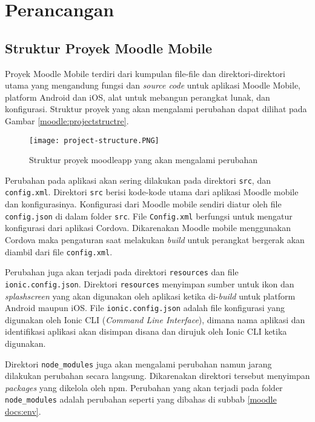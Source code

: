 \chapter{Perancangan}
\label{perancangan} 

\section{Struktur Proyek Moodle Mobile}
\label{struktur proyek}

Proyek Moodle Mobile terdiri dari kumpulan file-file dan direktori-direktori utama yang mengandung fungsi dan \textit{source code} untuk aplikasi Moodle Mobile, platform Android dan iOS, alat untuk mebangun perangkat lunak, dan konfigurasi. Struktur proyek yang akan mengalami perubahan dapat dilihat pada Gambar \ref{moodle:projectstructre}.
\\
\begin{figure}[H]
\centering
\texttt{[image: project-structure.PNG]}
\caption{Struktur proyek moodleapp yang akan mengalami perubahan}
\label{moodel:projectstructure}
\end{figure}

Perubahan pada aplikasi akan sering dilakukan pada direktori \texttt{src}, dan \texttt{config.xml}. Direktori \texttt{src} berisi kode-kode utama dari aplikasi Moodle mobile dan konfigurasinya. Konfigurasi dari Moodle mobile sendiri diatur oleh file \texttt{config.json} di dalam folder \texttt{src}. File \texttt{Config.xml} berfungsi untuk mengatur konfigurasi dari aplikasi Cordova. Dikarenakan Moodle mobile menggunakan Cordova maka pengaturan saat melakukan \textit{build} untuk perangkat bergerak akan diambil dari file \texttt{config.xml}. 

Perubahan juga akan terjadi pada direktori \texttt{resources} dan file \texttt{ionic.config.json}. Direktori \texttt{resources} menyimpan sumber untuk ikon dan \textit{splashscreen} yang akan digunakan oleh aplikasi ketika di-\textit{build} untuk platform Android maupun iOS. File \texttt{ionic.config.json} adalah file konfigurasi yang digunakan oleh  Ionic CLI (\textit{Command Line Interface}), dimana nama aplikasi dan identifikasi aplikasi akan disimpan disana dan dirujuk oleh Ionic CLI ketika digunakan.

Direktori \texttt{node\_modules} juga akan mengalami perubahan namun jarang dilakukan perubahan secara langsung. Dikarenakan direktori tersebut menyimpan \textit{packages} yang dikelola oleh npm. Perubahan yang akan terjadi pada folder \texttt{node\_modules} adalah perubahan seperti yang dibahas di subbab \ref{moodle docs:env}.

